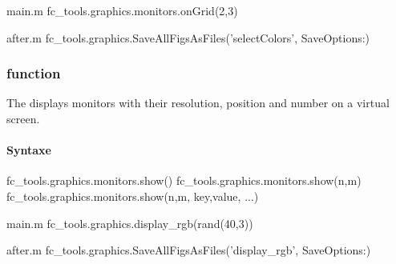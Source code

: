 \begin{filecontents*}{main.m}
fc_tools.graphics.monitors.onGrid(2,3)
\end{filecontents*}
\begin{filecontents*}{after.m}
fc_tools.graphics.SaveAllFigsAsFiles('selectColors', SaveOptions{:})
\end{filecontents*}


\subsubsection[fc\_tools.graphics.monitors.show function]{ function}
The  displays monitors with their resolution, position and number on
a virtual screen.
\paragraph{Syntaxe}
\begin{syntaxe}
fc_tools.graphics.monitors.show()
fc_tools.graphics.monitors.show(n,m)
fc_tools.graphics.monitors.show(n,m, key,value, ...)
\end{syntaxe}

\begin{filecontents*}{main.m}
fc_tools.graphics.display_rgb(rand(40,3))
\end{filecontents*}
\begin{filecontents*}{after.m}
fc_tools.graphics.SaveAllFigsAsFiles('display_rgb', SaveOptions{:})
\end{filecontents*}

\begin{center}
\end{center}
